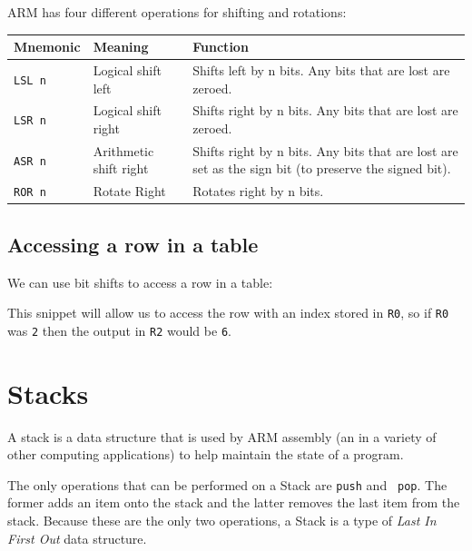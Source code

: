 ARM has four different operations for shifting and rotations:

\begin{center}
	\begin{tabularx}{\textwidth}{|l|X|X|}
		\hline
		{\bf Mnemonic} & {\bf Meaning} & {\bf Function}\\ \hline
		{\tt LSL n} & Logical shift left & Shifts left by n bits. Any bits that are lost are zeroed.\\ \hline
		{\tt LSR n} & Logical shift right &  Shifts right by n bits. Any bits that are lost are zeroed.\\ \hline
		{\tt ASR n} & Arithmetic shift right & Shifts right by n bits. Any bits that are lost are set as the sign bit (to preserve the signed bit).\\ \hline
		{\tt ROR n} & Rotate Right & Rotates right by n bits.\\ \hline
	\end{tabularx}
\end{center}

\subsection{Accessing a row in a table}

We can use bit shifts to access a row in a table:


This snippet will allow us to access the row with an index stored in {\tt R0},
so if {\tt R0} was {\tt 2} then the output in {\tt R2} would be {\tt 6}.

\section{Stacks}


A stack is a data structure that is used by ARM assembly (an in a variety of
other computing applications) to help maintain the state of a program.

The only operations that can be performed on a Stack are {\tt push} and {\tt
pop}. The former adds an item onto the stack and the latter removes the last
item from the stack. Because these are the only two operations, a Stack is a
type of {\it Last In First Out} data structure.

